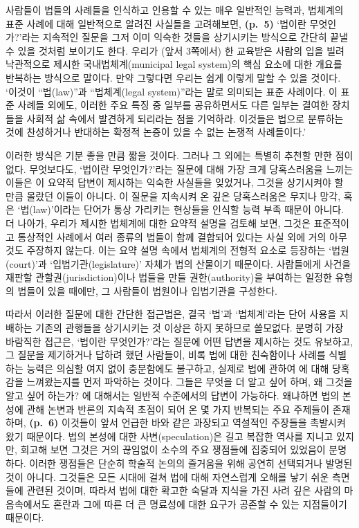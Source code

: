 사람들이 법들의 사례들을 인식하고 인용할 수 있는 매우 일반적인 능력과,
법체계의 표준 사례에 대해 일반적으로 알려진 사실들을 고려해보면,
\textbf{(p.~5)} ‘법이란 무엇인가?’라는 지속적인 질문을 그저 이미 익숙한
것들을 상기시키는 방식으로 간단히 끝낼 수 있을 것처럼 보이기도 한다.
우리가 (앞서 3쪽에서) 한 교육받은 사람의 입을 빌려 낙관적으로 제시한
국내법체계(municipal legal system)의 핵심 요소에 대한 개요를 반복하는
방식으로 말이다. 만약 그렇다면 우리는 쉽게 이렇게 말할 수 있을 것이다.
‘이것이 “법(law)”과 “법체계(legal system)”라는 말로 의미되는 표준
사례이다. 이 표준 사례들 외에도, 이러한 주요 특징 중 일부를 공유하면서도
다른 일부는 결여한 장치들을 사회적 삶 속에서 발견하게 되리라는 점을
기억하라. 이것들은 법으로 분류하는 것에 찬성하거나 반대하는 확정적
논증이 있을 수 없는 논쟁적 사례들이다.’

이러한 방식은 기분 좋을 만큼 짧을 것이다. 그러나 그 외에는 특별히 추천할
만한 점이 없다. 무엇보다도, ‘법이란 무엇인가?’라는 질문에 대해 가장 크게
당혹스러움을 느끼는 이들은 이 요약적 답변이 제시하는 익숙한 사실들을
잊었거나, 그것을 상기시켜야 할 만큼 몰랐던 이들이 아니다. 이 질문을
지속시켜 온 깊은 당혹스러움은 무지나 망각, 혹은 ‘법(law)’이라는 단어가
통상 가리키는 현상들을 인식할 능력 부족 때문이 아니다. 더 나아가, 우리가
제시한 법체계에 대한 요약적 설명을 검토해 보면, 그것은 표준적이고
통상적인 사례에서 여러 종류의 법들이 함께 결합되어 있다는 사실 외에 거의
아무것도 주장하지 않는다. 이는 요약 설명 속에서 법체계의 전형적 요소로
등장하는 ‘법원(court)’과 ‘입법기관(legislature)’ 자체가 법의 산물이기
때문이다. 사람들에게 사건을 재판할 관할권(jurisdiction)이나 법들을 만들
권한(authority)을 부여하는 일정한 유형의 법들이 있을 때에만, 그 사람들이
법원이나 입법기관을 구성한다.

따라서 이러한 질문에 대한 간단한 접근법은, 결국 ‘법’과 ‘법체계’라는 단어
사용을 지배하는 기존의 관행들을 상기시키는 것 이상은 하지 못하므로
쓸모없다. 분명히 가장 바람직한 접근은, ‘법이란 무엇인가?’라는 질문에
어떤 답변을 제시하는 것도 유보하고, 그 질문을 제기하거나 답하려 했던
사람들이, 비록 법에 대한 친숙함이나 사례를 식별하는 능력은 의심할 여지
없이 충분함에도 불구하고, 실제로 법에 관하여 에 대해 당혹감을
느껴왔는지를 먼저 파악하는 것이다. 그들은 무엇을 더 알고 싶어 하며, 왜
그것을 알고 싶어 하는가? 에 대해서는 일반적 수준에서의
답변이 가능하다. 왜냐하면 법의 본성에 관해 논변과 반론의 지속적 초점이
되어 온 몇 가지 반복되는 주요 주제들이 존재하며, \textbf{(p.~6)}
이것들이 앞서 언급한 바와 같은 과장되고 역설적인 주장들을 촉발시켜 왔기
때문이다. 법의 본성에 대한 사변(speculation)은 길고 복잡한 역사를 지니고
있지만, 회고해 보면 그것은 거의 끊임없이 소수의 주요 쟁점들에 집중되어
있었음이 분명하다. 이러한 쟁점들은 단순히 학술적 논의의 즐거움을 위해
공연히 선택되거나 발명된 것이 아니다. 그것들은 모든 시대에 걸쳐 법에
대해 자연스럽게 오해를 낳기 쉬운 측면들에 관련된 것이며, 따라서 법에
대한 확고한 숙달과 지식을 가진 사려 깊은 사람의 마음속에서도 혼란과 그에
따른 더 큰 명료성에 대한 요구가 공존할 수 있는 지점들이기 때문이다.

